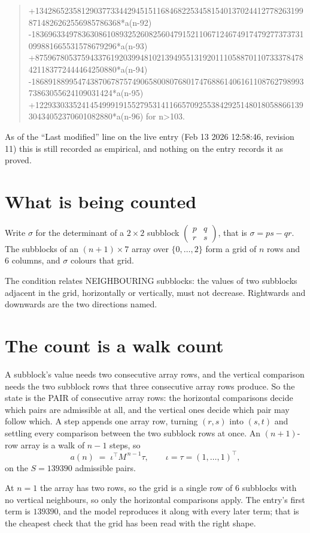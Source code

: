 \documentclass[11pt,a4paper]{article}
\theoremstyle{plain}
\theoremstyle{definition}
\begin{document}
\begin{quote}
+13428652358129037733442945151168468225345815401370244127782631998714826262556985786368*a(n-92) -18369633497836308610893252608256047915211067124674917479277373731099881665531578679296*a(n-93) +8759678053759433761920399481021394955131920111058870110733378478421183772444464250880*a(n-94) -1868918899547438706787574906580080768017476886140616110876279899373863055624109031424*a(n-95) +122933033524145499919155279531411665709255384292514801805886613930434052370601082880*a(n-96) for n>103.
\end{quote}
As of the ``Last modified'' line on the live entry (Feb 13 2026 12:58:46, revision 11) this is still
recorded as empirical, and nothing on the entry records it as proved.

\section{What is being counted}

Write $\sigma$ for the determinant of a $2\times2$ subblock
$\begin{pmatrix}p&q\\r&s\end{pmatrix}$, that is $\sigma=ps-qr$. The subblocks of an
$(n+1)\times7$ array over $\{0,\dots,2\}$ form a grid of $n$ rows and $6$
columns, and $\sigma$ colours that grid.

The condition relates NEIGHBOURING subblocks: the values of two subblocks adjacent in the grid,
horizontally or vertically, must not decrease. Rightwards and downwards are the two directions named.

\section{The count is a walk count}

A subblock's value needs two consecutive array rows, and the vertical
comparison needs the two subblock rows that three consecutive array rows produce. So the state
is the PAIR of consecutive array rows: the horizontal comparisons decide which pairs are
admissible at all, and the vertical ones decide which pair may follow which. A step appends one
array row, turning $(r,s)$ into $(s,t)$ and settling every comparison between the two subblock
rows at once. An $(n+1)$-row array is a walk of $n-1$ steps, so
\[
a(n)\;=\;\iota^{\!\top}M^{\,n-1}\tau,\qquad\iota=\tau=(1,\dots,1)^{\!\top},
\]
on the $S=139390$ admissible pairs.

At $n=1$ the array has two rows, so the grid is a single row of $6$
subblocks with no vertical neighbours, so only the horizontal comparisons apply. The
entry's first term is $139390$, and the model reproduces it along with every later term; that
is the cheapest check that the grid has been read with the right shape.
\end{document}
